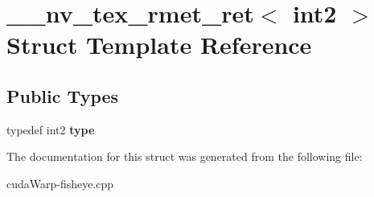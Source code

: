 \hypertarget{struct____nv__tex__rmet__ret_3_01int2_01_4}{}\section{\+\_\+\+\_\+nv\+\_\+tex\+\_\+rmet\+\_\+ret$<$ int2 $>$ Struct Template Reference}
\label{struct____nv__tex__rmet__ret_3_01int2_01_4}
\subsection*{Public Types}
\begin{DoxyCompactItemize}
\item 
typedef int2 {\bfseries type}\hypertarget{struct____nv__tex__rmet__ret_3_01int2_01_4_a65cdf8dc63aa1b63e59f7334ad5e361d}{}\label{struct____nv__tex__rmet__ret_3_01int2_01_4_a65cdf8dc63aa1b63e59f7334ad5e361d}

\end{DoxyCompactItemize}


The documentation for this struct was generated from the following file\+:\begin{DoxyCompactItemize}
\item 
cuda\+Warp-\/fisheye.\+cpp\end{DoxyCompactItemize}
